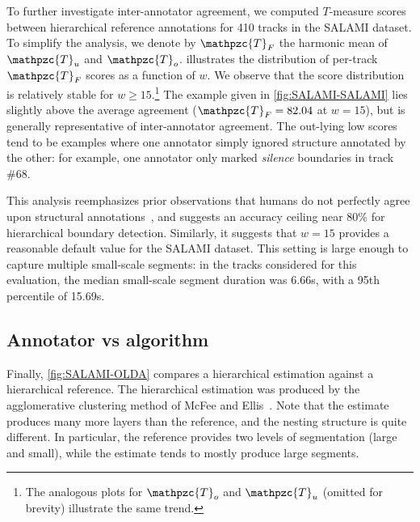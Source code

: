 \documentclass{article}
\def\shag{\ensuremath{\mathpzc{T}}}
\begin{document}
To further investigate inter-annotator agreement, we computed $T$-measure scores between hierarchical
reference annotations for 410 tracks in the SALAMI dataset.  To simplify the analysis, we denote by $\shag_F$
the harmonic mean of $\shag_u$ and $\shag_o$.   illustrates the distribution of
per-track $\shag_F$ scores as a function of $w$.  We observe that the score distribution is relatively stable
for $w \geq 15$.\footnote{The analogous plots for $\shag_o$ and $\shag_u$ (omitted for brevity) illustrate the same
trend.} 
The example given in \cref{fig:SALAMI-SALAMI} lies slightly above the average agreement ($\shag_F = 82.04$ at
$w=15$),
but is generally representative of inter-annotator agreement.
The out-lying low scores tend to be examples where one annotator simply ignored structure annotated
by the other: for example, one annotator only marked \emph{silence} boundaries in track \#68.

This analysis reemphasizes prior observations that humans do not perfectly agree upon structural
annotations~\cite{Smith2013}, and suggests an accuracy ceiling near 80\% for hierarchical boundary detection.
Similarly, it suggests that $w=15$ provides a reasonable default value for the SALAMI dataset.  This setting
is large enough to capture multiple small-scale segments: in the tracks considered for this evaluation, 
the median small-scale segment duration was 6.66s, with a 95th percentile of 15.69s.

\subsection{Annotator vs algorithm}
Finally, \cref{fig:SALAMI-OLDA} compares a hierarchical estimation against a hierarchical reference.
The hierarchical estimation was produced by the agglomerative clustering method of McFee and Ellis~\cite{McFee2014}.
Note that the estimate produces many more layers than the reference, and the nesting structure is quite different.
In particular, the reference provides two levels of segmentation (large and small), while the estimate tends
to mostly produce large segments.
\end{document}
